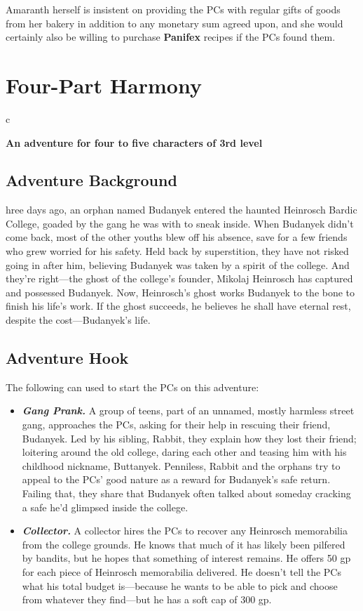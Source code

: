 \documentclass[10pt,a4paper,twoside,bg=print,twocolumn,openany,nodeprecatedcode]{dndbook}
\begin{document}
Amaranth herself is insistent on providing the PCs with regular gifts of goods from her bakery in addition to any monetary sum agreed upon, and she would certainly also be willing to purchase \textbf{Panifex} recipes if the PCs found them.

\chapter{Four-Part Harmony}

\begin{DndTable}{c}

\textbf{An adventure for four to five characters of 3rd level}\\
\end{DndTable}

\section{Adventure Background}
hree days ago, an orphan named Budanyek entered the haunted Heinrosch Bardic College, goaded by the gang he was with to sneak inside. When Budanyek didn't come back, most of the other youths blew off his absence, save for a few friends who grew worried for his safety. Held back by superstition, they have not risked going in after him, believing Budanyek was taken by a spirit of the college. And they're right—the ghost of the college's founder, Mikolaj Heinrosch has captured and possessed Budanyek. Now, Heinrosch's ghost works Budanyek to the bone to finish his life's work. If the ghost succeeds, he believes he shall have eternal rest, despite the cost—Budanyek's life.


\section{Adventure Hook}
The following can used to start the PCs on this adventure:


\begin{itemize}
\item \textbf{\textit{Gang Prank.}} A group of teens, part of an unnamed, mostly harmless street gang, approaches the PCs, asking for their help in rescuing their friend, Budanyek. Led by his sibling, Rabbit, they explain how they lost their friend; loitering around the old college, daring each other and teasing him with his childhood nickname, Buttanyek. Penniless, Rabbit and the orphans try to appeal to the PCs' good nature as a reward for Budanyek's safe return. Failing that, they share that Budanyek often talked about someday cracking a safe he'd glimpsed inside the college.
\item \textbf{\textit{Collector.}} A collector hires the PCs to recover any Heinrosch memorabilia from the college grounds. He knows that much of it has likely been pilfered by bandits, but he hopes that something of interest remains. He offers 50 gp for each piece of Heinrosch memorabilia delivered. He doesn't tell the PCs what his total budget is—because he wants to be able to pick and choose from whatever they find—but he has a soft cap of 300 gp.
\end{itemize}
\end{document}
